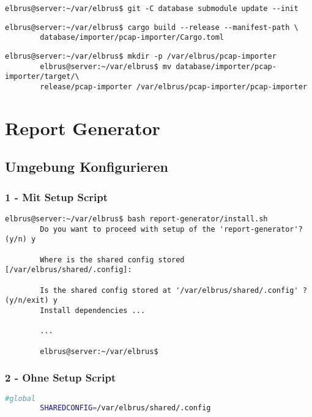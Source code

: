 \documentclass{article}
\begin{document}
	\lstset{style=commands}

	\begin{lstlisting}[caption={Updaten der git Submodule.}]
		elbrus@server:~/var/elbrus$ git -C database submodule update --init
	\end{lstlisting}

	\begin{lstlisting}[caption={Kompilieren des 'pcap-importers'.}]
		elbrus@server:~/var/elbrus$ cargo build --release --manifest-path \
		database/importer/pcap-importer/Cargo.toml
	\end{lstlisting}

	\begin{lstlisting}[caption={Kopieren des 'pcap-importers' in ein eigenes Verzeichniss.}]
		elbrus@server:~/var/elbrus$ mkdir -p /var/elbrus/pcap-importer
		elbrus@server:~/var/elbrus$ mv database/importer/pcap-importer/target/\
		release/pcap-importer /var/elbrus/pcap-importer/pcap-importer
	\end{lstlisting}
	\newpage
	
	\section{Report Generator}

	\subsection[file config]{Umgebung Konfigurieren}
	
	\subsubsection{1 - Mit Setup Script}
	
	\begin{lstlisting}[caption={Ausführen des 'install.sh' Scripts.}]
		elbrus@server:~/var/elbrus$ bash report-generator/install.sh
		Do you want to proceed with setup of the 'report-generator'? (y/n) y
		
		Where is the shared config stored [/var/elbrus/shared/.config]:
		
		Is the shared config stored at '/var/elbrus/shared/.config' ? (y/n/exit) y
		Install dependencies ...
		
		...
		
		elbrus@server:~/var/elbrus$
	\end{lstlisting}

	\subsubsection{2 - Ohne Setup Script}
	\begin{lstlisting}[caption={Anhand von '.env.example' eigene '.env' Datei anlegen.}, language=bash]
		#global
		SHAREDCONFIG=/var/elbrus/shared/.config
	\end{lstlisting}
	
\end{document}
